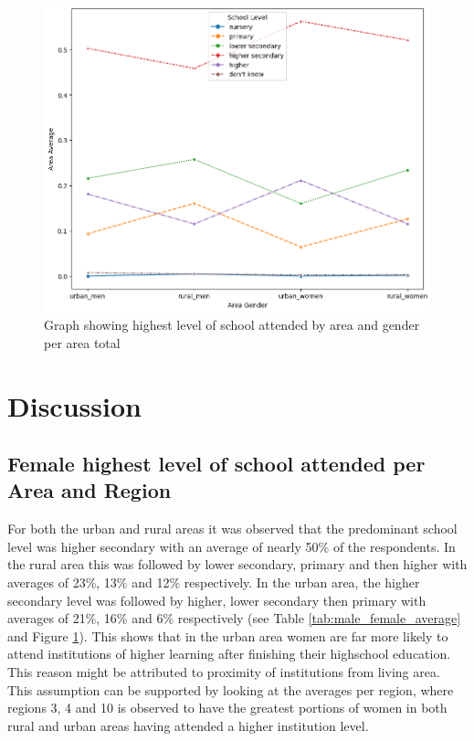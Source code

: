 \documentclass[stu, 12pt, floatsintext,longtable]{apa7}
\begin{document}
\begin{figure}[H]
    \centering

    \includegraphics[width=\linewidth]{graphics/male_female_attendance_averages.png}
    \caption{Graph showing highest level of school attended by area and gender
        per area total}
    \label{fig:male_female_average}
\end{figure}
\newpage
\section{Discussion}
\subsection{Female highest level of school attended per Area and Region}

For both the urban and rural areas it was observed that the predominant school
level was higher secondary with an average of nearly 50\% of the respondents.
In the rural area this was followed by lower secondary,
primary and then higher with averages of 23\%, 13\% and 12\% respectively.
In the urban area, the higher secondary level was followed by higher, lower
secondary then primary with averages of 21\%, 16\% and 6\% respectively (see
Table \ref{tab:male_female_average} and Figure \ref{fig:male_female_average}).
This shows that in the urban area women are far more likely to attend
institutions of higher learning after finishing their highschool education.
This reason might be attributed to proximity of institutions from living area.
This assumption can be supported by looking at the averages per region, where
regions 3, 4 and 10 is observed to have the greatest portions of women in both
rural and urban areas having attended a higher institution level.
\end{document}
